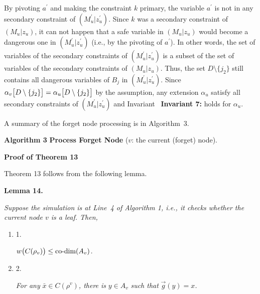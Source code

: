 By pivoting $a^{\prime}$ and making the constraint $k$ primary, the variable $a^{\prime}$ is not in any secondary constraint of $(M^{\prime}_{u}|z^{\prime}_{u})$.
Since $k$ was a secondary constraint of $(M_{u}|z_{u})$, it can not happen that a safe variable in $(M_{u}|z_{u})$ would become a dangerous one in $(M^{\prime}_{u}|z^{\prime}_{u})$ (i.e., by the pivoting of $a^{\prime}$).
In other words, the set of variables of the secondary constraints of $(M^{\prime}_{u}|z^{\prime}_{u})$ is a subset of the set of variables of the secondary constraints of $(M_{u}|z_{u})$.
Thus, the set $D\setminus\{j_{2}\}$ still contains all dangerous variables of $B_{j}$ in $(M^{\prime}_{u}|z^{\prime}_{u})$.
Since $\alpha_{v}\bigl{[}D\setminus\{j_{2}\}\bigr{]}=\alpha_{u}\bigl{[}D\setminus\{j_%
{2}\}\bigr{]}$ by the assumption, any extension $\alpha_{u}$ satisfy all secondary constraints of $(M^{\prime}_{u}|z^{\prime}_{u})$ and Invariant \textbf{ Invariant 7:} holds for $\alpha_{u}$.\par




A summary of the forget node processing is in Algorithm 3.\par



\textbf{Algorithm 3}  \textbf{Process Forget Node} ($v$: the current (forget) node).





\par\medskip\noindent\textbf{Proof of Theorem 13
}\par




Theorem 13 follows from the following lemma.\par





\par\medskip\noindent\textbf{
\textbf{Lemma 14}\textbf{.}
}\par



\emph{Suppose the simulation is at Line 4 of Algorithm 1, i.e., it checks whether the current node $v$ is a leaf.
Then,}\par


\begin{enumerate}


\item[] 
1. 


$w\bigl{(}C(\rho_{v})\bigr{)}\leq\text{co-dim}(A_{v})$\emph{.}\par





\item[] 
2. 


\emph{For any }$\bar{x}\in C(\rho^{v})$\emph{, there is }$y\in A_{v}$\emph{ such that }$\overrightarrow{g}(y)=x$\emph{.}\par





\end{enumerate}



